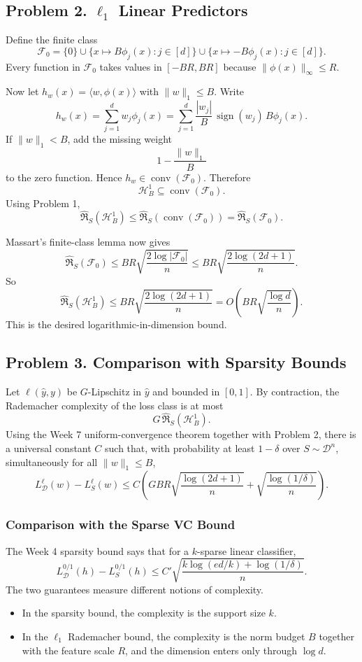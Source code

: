 \documentclass{article}
\DeclareMathOperator{\conv}{conv}
\DeclareMathOperator{\sign}{sign}
\newcommand{\cD}{\mathcal{D}}
\newcommand{\cF}{\mathcal{F}}
\newcommand{\cH}{\mathcal{H}}
\begin{document}
\subsection{\texorpdfstring{Problem 2. $\ell_1$ Linear Predictors}{Problem 2. l1 Linear Predictors}}

Define the finite class
$$
\cF_0
=
\{0\}\cup \{x\mapsto B\phi_j(x):j\in[d]\}\cup \{x\mapsto -B\phi_j(x):j\in[d]\}.
$$
Every function in $\cF_0$ takes values in $[-BR,BR]$ because $\|\phi(x)\|_\infty\le R$.

Now let $h_w(x)=\langle w,\phi(x)\rangle$ with $\|w\|_1\le B$. Write
$$
h_w(x)
=
\sum_{j=1}^d w_j \phi_j(x)
=
\sum_{j=1}^d \frac{|w_j|}{B}\,\sign(w_j)\,B\phi_j(x).
$$
If $\|w\|_1<B$, add the missing weight
$$
1-\frac{\|w\|_1}{B}
$$
to the zero function. Hence $h_w\in \conv(\cF_0)$. Therefore
$$
\cH_B^1 \subseteq \conv(\cF_0).
$$
Using Problem 1,
$$
\widehat{\mathfrak{R}}_S(\cH_B^1)
\le
\widehat{\mathfrak{R}}_S(\conv(\cF_0))
=
\widehat{\mathfrak{R}}_S(\cF_0).
$$

Massart's finite-class lemma now gives
$$
\widehat{\mathfrak{R}}_S(\cF_0)
\le
BR \sqrt{\frac{2\log |\cF_0|}{n}}
\le
BR \sqrt{\frac{2\log(2d+1)}{n}}.
$$
So
$$
\widehat{\mathfrak{R}}_S(\cH_B^1)
\le
BR \sqrt{\frac{2\log(2d+1)}{n}}
=
O\!\left(
BR\sqrt{\frac{\log d}{n}}
\right).
$$
This is the desired logarithmic-in-dimension bound.

\subsection{\texorpdfstring{Problem 3. Comparison with Sparsity Bounds}{Problem 3. Comparison with Sparsity Bounds}}

Let $\ell(\widehat{y},y)$ be $G$-Lipschitz in $\widehat{y}$ and bounded in $[0,1]$. By contraction,
the Rademacher complexity of the loss class is at most
$$
G\,\widehat{\mathfrak{R}}_S(\cH_B^1).
$$
Using the Week 7 uniform-convergence theorem together with Problem 2, there is a universal constant $C$ such that, with probability at least $1-\delta$ over $S\sim \cD^n$, simultaneously for all $\|w\|_1\le B$,
$$
L^\ell_{\cD}(w)-L^\ell_S(w)
\le
C\left(
GBR\sqrt{\frac{\log(2d+1)}{n}}
+
\sqrt{\frac{\log(1/\delta)}{n}}
\right).
$$

\subsubsection{Comparison with the Sparse VC Bound}

The Week 4 sparsity bound says that for a $k$-sparse linear classifier,
$$
L^{0/1}_{\cD}(h)-L^{0/1}_S(h)
\le
C'
\sqrt{
\frac{k\log(ed/k)+\log(1/\delta)}{n}
}.
$$
The two guarantees measure different notions of complexity.
\begin{itemize}
\item In the sparsity bound, the complexity is the support size $k$.
\item In the $\ell_1$ Rademacher bound, the complexity is the norm budget $B$ together with the feature scale $R$, and the dimension enters only through $\log d$.
\end{itemize}
\end{document}
